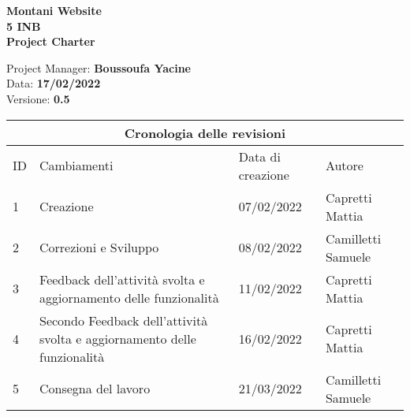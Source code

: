 \documentclass{article}
\begin{document}
	
	
	
	
	
	\begin{titlepage}
		
		\begin{center}
			
			\huge\textbf{Montani Website}\\
			
			\Large\textbf{5 INB}\\
			
			\Large \textbf{Project Charter}\\
			
			\vspace{4cm}
			
			\large Project Manager: \textbf{Boussoufa Yacine}\\
			
			\large Data: \textbf{17/02/2022}\\
			
			\large Versione: \textbf{0.5}\\
			
		\end{center}
		
	\end{titlepage}
	
	
	
	\clearpage
	
	
	
	\begin{tabular}{ |p{1cm}|p{4cm}|p{3cm}|p{2cm}|  }
		
		\hline
		
		\multicolumn{4}{|c|}{Cronologia delle revisioni} \\
		
		\hline
		
		ID& Cambiamenti &Data di creazione&Autore\\
		
		\hline
		
		1   & Creazione    &07/02/2022&   Capretti Mattia\\
		
		\hline
		
		2   & Correzioni e Sviluppo    &08/02/2022&   Camilletti Samuele\\
		
		\hline
		
		3   & Feedback dell'attività svolta e aggiornamento delle funzionalità    &11/02/2022&   Capretti Mattia\\
		
		\hline
		
		4   & Secondo Feedback dell'attività svolta e aggiornamento delle funzionalità    &16/02/2022&   Capretti Mattia\\
		
		\hline
		
		5  & Consegna del lavoro   &21/03/2022&   Camilletti Samuele\\
		
		\hline
		
		
	\end{tabular}
	
\end{document}
